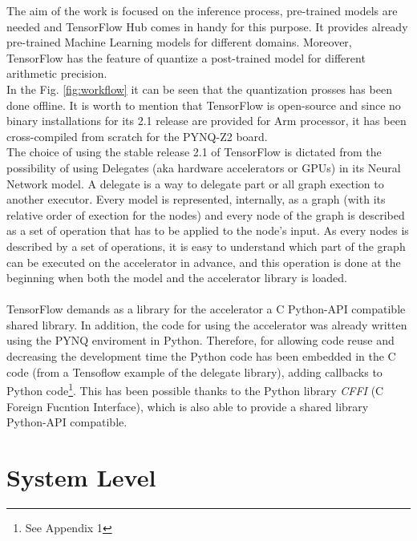 The aim of the work is focused on the inference process, pre-trained models are needed and TensorFlow Hub \cite{WEBSITE:5} comes in handy for this purpose. It provides already pre-trained Machine Learning models for different domains. Moreover, TensorFlow has the feature of quantize a post-trained model for different arithmetic precision.\\

In the Fig. \ref{fig:workflow} it can be seen that the quantization prosses has been done offline. It is worth to mention that TensorFlow is open-source and since no binary installations for its 2.1 release are provided for Arm processor, it has been cross-compiled from scratch for the PYNQ-Z2 board.\\

The choice of using the stable release 2.1 of TensorFlow is dictated from the possibility of using Delegates (aka hardware accelerators or GPUs) in its Neural Network model. A delegate is a way to delegate part or all graph exection to another executor. Every model is represented, internally, as a graph (with its relative order of exection for the nodes) and every node of the graph is described as a set of operation that has to be applied to the node's input. As every nodes is described by a set of operations, it is easy to understand which part of the graph can be executed on the accelerator in advance, and this operation is done at the beginning when both the model and the accelerator library is loaded.\\\\

TensorFlow demands as a library for the accelerator a C Python-API compatible shared library. In addition, the code for using the accelerator was already written using the PYNQ enviroment in Python. Therefore, for allowing code reuse and  decreasing the development time the Python code has been embedded in the C code (from a Tensoflow example of the delegate library), adding callbacks to Python code\footnote{See Appendix 1}. This has been possible thanks to the Python library \textit{CFFI} (C Foreign Fucntion Interface)\cite{WEBSITE:14}, which is also able to provide a shared library Python-API compatible.


\newpage
\section{System Level}

